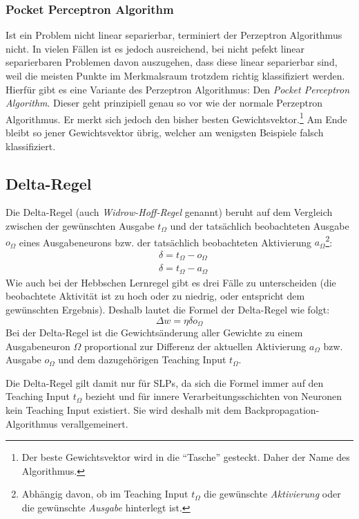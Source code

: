 \subsubsection*{Pocket Perceptron Algorithm}
Ist ein Problem nicht linear separierbar, terminiert der Perzeptron Algorithmus nicht. In vielen Fällen ist es jedoch ausreichend, bei nicht pefekt linear separierbaren Problemen davon auszugehen, dass diese linear separierbar sind, weil die meisten Punkte im Merkmalsraum trotzdem richtig klassifiziert werden.
Hierfür gibt es eine Variante des Perzeptron Algorithmus: Den \emph{Pocket Perceptron Algorithm}. Dieser geht prinzipiell genau so vor wie der normale Perzeptron Algorithmus. Er merkt sich jedoch den bisher besten Gewichtsvektor.\footnote{Der beste Gewichtsvektor wird in die "`Tasche"' gesteckt. Daher der Name des Algorithmus.} Am Ende bleibt so jener Gewichtsvektor übrig, welcher am wenigsten Beispiele falsch klassifiziert.

\subsection*{Delta-Regel}
Die Delta-Regel (auch \emph{Widrow-Hoff-Regel} genannt) beruht auf dem Vergleich zwischen der gewünschten Ausgabe $t_{\Omega}$ und der tatsächlich beobachteten Ausgabe $o_{\Omega}$ eines Ausgabeneurons bzw. der tatsächlich beobachteten Aktivierung $a_{\Omega}$\footnote{Abhängig davon, ob im Teaching Input $t_{\Omega}$ die gewünschte \emph{Aktivierung} oder die gewünschte \emph{Ausgabe} hinterlegt ist.}:
\begin{align*}
	&\delta = t_{\Omega} - o_{\Omega} \\
	&\delta = t_{\Omega} - a_{\Omega}
\end{align*}
Wie auch bei der Hebbschen Lernregel gibt es drei Fälle zu unterscheiden (die beobachtete Aktivität ist zu hoch oder zu niedrig, oder entspricht dem gewünschten Ergebnis). Deshalb lautet die Formel der Delta-Regel wie folgt:
\[
	\Delta w = \eta \delta o_{\Omega}
\]
Bei der Delta-Regel ist die Gewichtsänderung aller Gewichte zu einem Ausgabeneuron $\Omega$ proportional zur Differenz der aktuellen Aktivierung $a_{\Omega}$ bzw. Ausgabe $o_{\Omega}$ und dem dazugehörigen Teaching Input $t_{\Omega}$.  

Die Delta-Regel gilt damit nur für SLPs, da sich die Formel immer auf den Teaching Input $t_{\Omega}$ bezieht und für innere Verarbeitungsschichten von Neuronen kein Teaching Input existiert. Sie wird deshalb mit dem Backpropagation-Algorithmus verallgemeinert.


